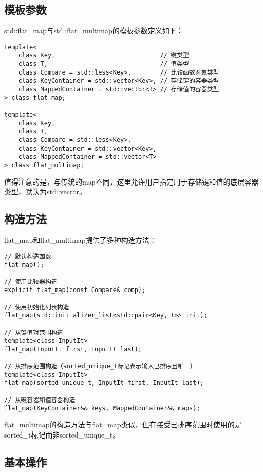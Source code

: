 \documentclass[a4paper, 12pt]{article}
\begin{document}
\subsection{模板参数}

std::flat\_map与std::flat\_multimap的模板参数定义如下：

\begin{lstlisting}[style=cpp]
template<
    class Key,                             // 键类型
    class T,                               // 值类型
    class Compare = std::less<Key>,        // 比较函数对象类型
    class KeyContainer = std::vector<Key>, // 存储键的容器类型
    class MappedContainer = std::vector<T> // 存储值的容器类型
> class flat_map;

template<
    class Key,
    class T,
    class Compare = std::less<Key>,
    class KeyContainer = std::vector<Key>,
    class MappedContainer = std::vector<T>
> class flat_multimap;
\end{lstlisting}

值得注意的是，与传统的map不同，这里允许用户指定用于存储键和值的底层容器类型，默认为std::vector。

\subsection{构造方法}

flat\_map和flat\_multimap提供了多种构造方法：

\begin{lstlisting}[style=cpp]
// 默认构造函数
flat_map();

// 使用比较器构造
explicit flat_map(const Compare& comp);

// 使用初始化列表构造
flat_map(std::initializer_list<std::pair<Key, T>> init);

// 从键值对范围构造
template<class InputIt>
flat_map(InputIt first, InputIt last);

// 从排序范围构造（sorted_unique_t标记表示输入已排序且唯一）
template<class InputIt>
flat_map(sorted_unique_t, InputIt first, InputIt last);

// 从键容器和值容器构造
flat_map(KeyContainer&& keys, MappedContainer&& maps);
\end{lstlisting}

flat\_multimap的构造方法与flat\_map类似，但在接受已排序范围时使用的是sorted\_t标记而非sorted\_unique\_t。

\subsection{基本操作}
\end{document}
